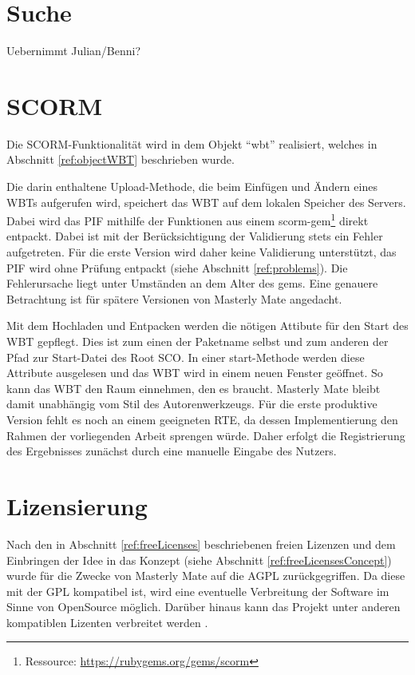 \section{Suche}
\begin{k}
Uebernimmt Julian/Benni?
\end{k}

\section{SCORM}\label{ref:implSCORM}
Die SCORM-Funktionalität wird in dem Objekt "`wbt"' realisiert, welches in
Abschnitt \ref{ref:objectWBT} beschrieben wurde. 

Die darin enthaltene Upload-Methode, die beim Einfügen und Ändern eines WBTs
aufgerufen wird, speichert das WBT auf dem lokalen Speicher des Servers. Dabei
wird das \ac{PIF} mithilfe der Funktionen aus einem
scorm-gem\footnote{Ressource: \url{https://rubygems.org/gems/scorm}} direkt
entpackt. Dabei ist mit der Berücksichtigung der Validierung stets ein Fehler
aufgetreten. Für die erste Version wird daher keine Validierung unterstützt, das
PIF wird ohne Prüfung entpackt (siehe Abschnitt \ref{ref:problems}). Die
Fehlerursache liegt unter Umständen an dem Alter des gems. Eine genauere Betrachtung ist für
spätere Versionen von Masterly Mate angedacht. 

Mit dem Hochladen und Entpacken werden die nötigen Attibute für den Start des
WBT gepflegt. Dies ist zum einen der Paketname selbst und zum anderen der Pfad
zur Start-Datei des Root SCO. In einer start-Methode werden diese Attribute
ausgelesen und das WBT wird in einem neuen Fenster geöffnet. So kann das WBT den
Raum einnehmen, den es braucht. Masterly Mate bleibt damit unabhängig vom Stil
des Autorenwerkzeugs. Für die erste produktive Version fehlt es noch an einem
geeigneten RTE, da dessen Implementierung den Rahmen der vorliegenden Arbeit
sprengen würde. Daher erfolgt die Registrierung des Ergebnisses zunächst durch
eine manuelle Eingabe des Nutzers.

\section{Lizensierung}
Nach den in Abschnitt \ref{ref:freeLicenses} beschriebenen freien Lizenzen und
dem Einbringen der Idee in das Konzept (siehe Abschnitt
\ref{ref:freeLicensesConcept}) wurde für die Zwecke von Masterly Mate auf die
\ac{AGPL} zurückgegriffen. Da diese mit der \ac{GPL} kompatibel ist, wird
eine eventuelle Verbreitung der Software im Sinne von OpenSource möglich.
Darüber hinaus kann das Projekt unter anderen kompatiblen Lizenten verbreitet
werden \cite{fsf:2007}.

